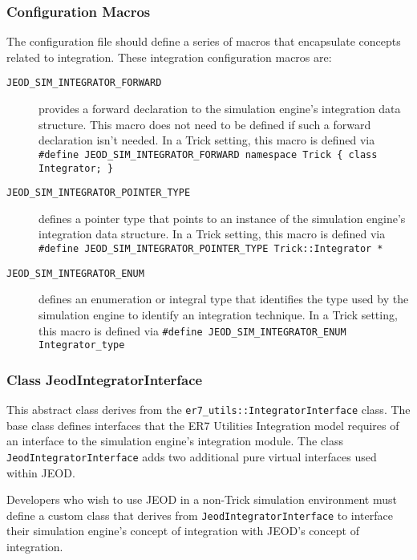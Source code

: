 \subsubsection{Configuration Macros}
The configuration file should define a series of macros that encapsulate
concepts related to integration. These integration configuration macros are:
\begin{description}
\item[\tt JEOD\_SIM\_INTEGRATOR\_FORWARD]
provides a forward declaration to the simulation engine's
integration data structure. This macro does not need to be defined
if such a forward declaration isn't needed.
In a Trick setting, this macro is defined via\newline
{\tt \#define JEOD\_SIM\_INTEGRATOR\_FORWARD %
namespace Trick \{ class Integrator; \}}

\item[\tt JEOD\_SIM\_INTEGRATOR\_POINTER\_TYPE]
defines a pointer type that points to an instance of the
simulation engine's integration data structure.
In a Trick setting, this macro is defined via\newline
{\tt \#define JEOD\_SIM\_INTEGRATOR\_POINTER\_TYPE Trick::Integrator *}

\item[\tt JEOD\_SIM\_INTEGRATOR\_ENUM]
defines an enumeration or integral type that identifies
the type used by the simulation engine to identify an integration technique.
In a Trick setting, this macro is defined via\newline
{\tt \#define JEOD\_SIM\_INTEGRATOR\_ENUM Integrator\_type}
\end{description}

\subsubsection{Class JeodIntegratorInterface}
This abstract class derives from the \verb|er7_utils::IntegratorInterface|
class. The base class defines interfaces that the ER7 Utilities Integration
model requires of an interface to the simulation engine's integration module.
The class \verb|JeodIntegratorInterface| adds two additional pure virtual
interfaces used within JEOD.

Developers who wish to use JEOD in a non-Trick simulation environment
must define a custom class that derives from \verb|JeodIntegratorInterface|
to interface their simulation engine's concept of integration
with JEOD's concept of integration.

